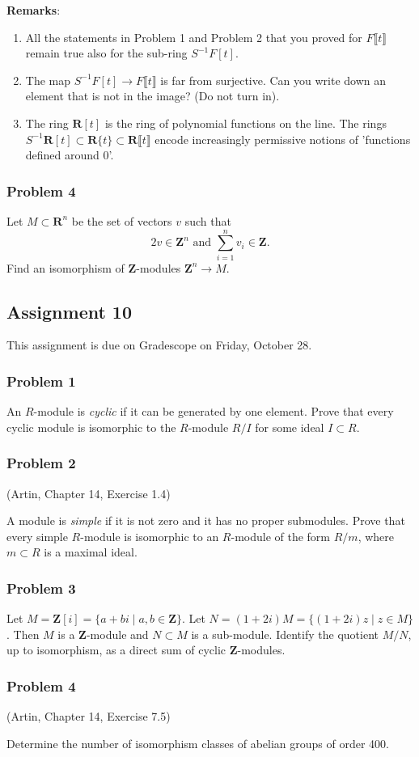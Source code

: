 \documentclass[11pt]{article}
\begin{document}
\textbf{\textbf{Remarks}}:
\begin{enumerate}
\item All the statements in Problem 1 and Problem 2 that you proved for \(F \llbracket t \rrbracket\) remain true also for the sub-ring \(S^{-1}F[t]\).
\item The map \(S^{-1} F[t] \to F \llbracket t \rrbracket\) is far from surjective.
Can you write down an element that is not in the image? (Do not turn in).
\item The ring \(\mathbf{R}[t]\) is the ring of polynomial functions on the line.
The rings \(S^{-1} \mathbf{R}[t] \subset \mathbf{R}\{t\} \subset \mathbf{R}\llbracket t \rrbracket\) encode increasingly permissive notions of 'functions defined around 0'.
\end{enumerate}

\subsubsection*{Problem 4}
\label{sec:org6230d3d}
Let \(M \subset \mathbf{R}^{n}\) be the set of vectors \(v\) such that
\[ 2v \in \mathbf{Z}^n \text{ and } \sum_{i = 1}^n v_i \in \mathbf{Z}.\]
Find an isomorphism of \(\mathbf{Z}\)-modules \(\mathbf{Z}^n \to M\).

\subsection*{Assignment 10}
\label{sec:org7387e16}
This assignment is due on Gradescope on Friday, October 28.
\subsubsection*{Problem 1}
\label{sec:org3724d97}
An \(R\)-module is \emph{cyclic} if it can be generated by one element.
Prove that every cyclic module is isomorphic to the \(R\)-module \(R/I\) for some ideal \(I \subset R\).

\subsubsection*{Problem 2}
\label{sec:org091a00b}
(Artin, Chapter 14, Exercise 1.4)

A module is \emph{simple} if it is not zero and it has no proper submodules.
Prove that every simple \(R\)-module is isomorphic to an \(R\)-module of the form \(R/m\), where \(m \subset R\) is a maximal ideal.
\subsubsection*{Problem 3}
\label{sec:org9d33451}
Let \(M = \mathbf{Z}[i] = \{a + b i \mid a, b \in \mathbf{Z}\}\).
Let \(N = (1+2i) M = \{(1+2i)z \mid z \in M\}\).
Then \(M\) is a \(\mathbf{Z}\)-module and \(N \subset M\) is a sub-module.
Identify the quotient \(M/N\), up to isomorphism, as a direct sum of cyclic \(\mathbf{Z}\)-modules.

\subsubsection*{Problem 4}
\label{sec:org3bf7488}
(Artin, Chapter 14, Exercise 7.5)

Determine the number of isomorphism classes of abelian groups of order 400.
\end{document}
